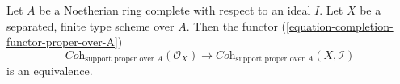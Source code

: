 %
\begin{theorem}
\label{theorem-grothendieck-existence}
\begin{reference}
\cite[III Theorem 5.1.5]{EGA}
\end{reference}
Let $A$ be a Noetherian ring complete with respect to an ideal $I$.
Let $X$ be a separated, finite type scheme over $A$. Then
the functor
(\ref{equation-completion-functor-proper-over-A})
$$
\textit{Coh}_{\text{support proper over }A}(\mathcal{O}_X)
\longrightarrow
\textit{Coh}_{\text{support proper over }A}(X, \mathcal{I})
$$
is an equivalence.
\end{theorem}

